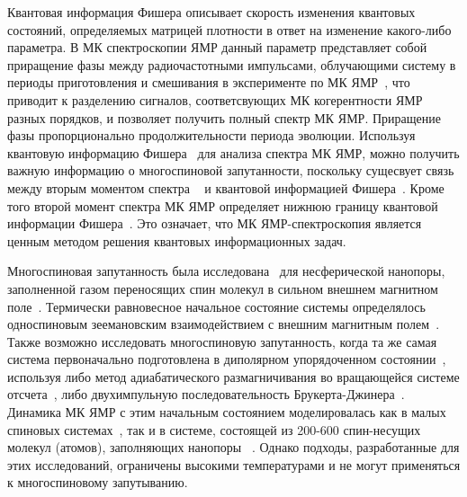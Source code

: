 \documentclass[review]{elsarticle}
\begin{document}
Квантовая информация Фишера описывает скорость изменения квантовых состояний, определяемых матрицей плотности в ответ на изменение какого-либо параметра.
В МК спектроскопии ЯМР данный параметр представляет собой приращение фазы между радиочастотными импульсами, облучающими систему в периоды приготовления и смешивания в эксперименте по МК ЯМР~\cite{Baum_1985}, 
что приводит к разделению сигналов, соответсвующих МК когерентности ЯМР разных порядков, и позволяет получить полный спектр МК ЯМР. 
Приращение фазы пропорционально продолжительности периода эволюции.
Используя квантовую информацию Фишера~\cite{Liu_2014} для анализа спектра МК ЯМР, можно получить важную информацию о многоспиновой запутанности,
поскольку сущесвует связь между вторым моментом спектра ~\cite{Khitrin_1997} и квантовой информацией Фишера~\cite{G_rttner_2018,Doronin_2019}.
Кроме того второй момент спектра МК ЯМР определяет нижнюю границу квантовой информации Фишера~\cite{G_rttner_2018}.
Это означает, что МК ЯМР-спектроскопия является ценным методом решения квантовых информационных задач.

Многоспиновая запутанность была исследована~\cite{Doronin_2019} для несферической нанопоры, заполненной газом переносящих спин молекул в сильном внешнем магнитном поле~\cite{Baugh_2001,Doronin_2009}.
Термически равновесное начальное состояние системы определялось односпиновым зеемановским взаимодействием с внешним магнитным полем~\cite{Doronin_2007a}.
Также возможно исследовать многоспиновую запутанность, когда та же самая система первоначально подготовлена в диполярном упорядоченном состоянии~\cite{Goldman_1970}, используя либо метод адиабатического размагничивания во вращающейся системе отсчета~\cite{Goldman_1970, Slichter_1961}, либо двухимпульную последовательность Брукерта-Джинера~\cite{Goldman_1970, Jeener_1967}.
Динамика МК ЯМР с этим начальным состоянием моделировалась как в малых спиновых системах~\cite{Doronin_2007a, Doronin_2007b}, так и в системе, состоящей из 200-600 спин-несущих молекул (атомов), заполняющих нанопоры ~\cite{Doronin_2011}.
Однако подходы, разработанные для этих исследований, ограничены высокими температурами и не могут применяться к многоспиновому запутыванию.
\end{document}
